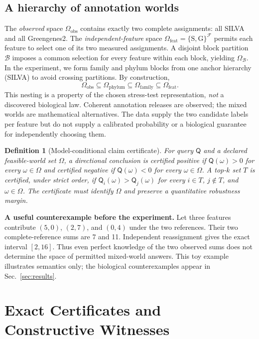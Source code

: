 \documentclass[conference]{IEEEtran}
\newtheorem{definition}{Definition}
\newcommand{\OO}{\mathcal{\Omega}}
\newcommand{\F}{\mathcal{F}}
\newcommand{\B}{\mathcal{B}}
\newcommand{\Q}{\mathsf{Q}}
\newcommand{\Sref}{\mathrm{S}}
\newcommand{\Gref}{\mathrm{G}}
\begin{document}
\subsection{A hierarchy of annotation worlds}
The \emph{observed} space $\OO_{\mathrm{obs}}$ contains exactly two complete assignments: all SILVA and all Greengenes2. The \emph{independent-feature} space $\OO_{\mathrm{feat}}=\{\Sref,\Gref\}^{\F}$ permits each feature to select one of its two measured assignments. A disjoint block partition $\B$ imposes a common selection for every feature within each block, yielding $\OO_{\B}$. In the experiment, we form family and phylum blocks from one anchor hierarchy (SILVA) to avoid crossing partitions. By construction,
\begin{equation}
\OO_{\mathrm{obs}}\subseteq\OO_{\mathrm{phylum}}\subseteq\OO_{\mathrm{family}}\subseteq\OO_{\mathrm{feat}}.
\label{eq:worldnest}
\end{equation}
This nesting is a property of the chosen stress-test representation, \emph{not} a discovered biological law. Coherent annotation releases are observed; the mixed worlds are mathematical alternatives. The data supply the two candidate labels per feature but do not supply a calibrated probability or a biological guarantee for independently choosing them.

\begin{definition}[Model-conditional claim certificate]
For query $\Q$ and a declared feasible-world set $\OO$, a directional conclusion is certified positive if $\Q(\omega)>0$ for every $\omega\in\OO$ and certified negative if $\Q(\omega)<0$ for every $\omega\in\OO$. A top-$k$ set $T$ is certified, under strict order, if $\Q_i(\omega)>\Q_j(\omega)$ for every $i\in T$, $j\notin T$, and $\omega\in\OO$. The certificate must identify $\OO$ and preserve a quantitative robustness margin.
\end{definition}

\noindent\textbf{A useful counterexample before the experiment.} Let three features contribute $(5,0)$, $(2,7)$, and $(0,4)$ under the two references. Their two complete-reference sums are 7 and 11. Independent reassignment gives the exact interval $[2,16]$. Thus even perfect knowledge of the two observed sums does not determine the space of permitted mixed-world answers. This toy example illustrates semantics only; the biological counterexamples appear in Sec.~\ref{sec:results}.

\section{Exact Certificates and Constructive Witnesses}
\label{sec:cert}
\end{document}
